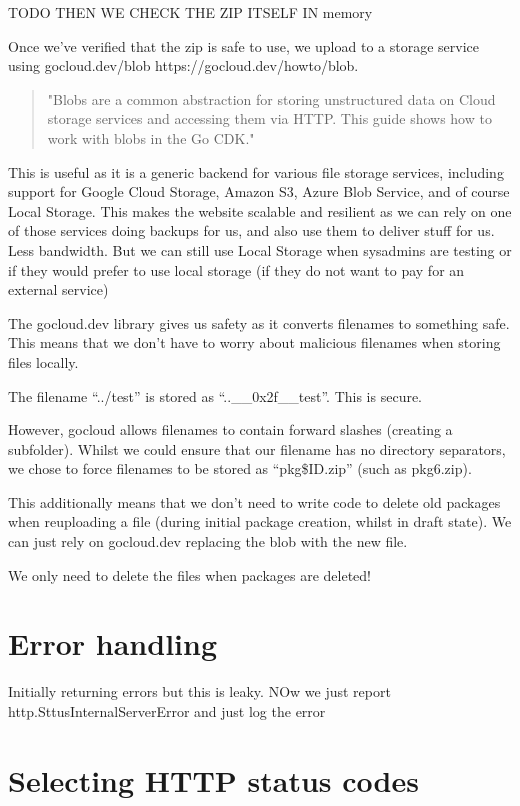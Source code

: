 \documentclass[bsc,frontabs,twoside,singlespacing,parskip,deptreport]{infthesis}     %
\begin{document}
TODO THEN WE CHECK THE ZIP ITSELF IN memory

Once we've verified that the zip is safe to use, we upload to a storage service using gocloud.dev/blob https://gocloud.dev/howto/blob.

\begin{quote}
  "Blobs are a common abstraction for storing unstructured data on Cloud storage services and accessing them via HTTP. This guide shows how to work with blobs in the Go CDK."
\end{quote}

This is useful as it is a generic backend for various file storage services, including support for Google Cloud Storage, Amazon S3, Azure Blob Service, and of course Local Storage. This makes the website scalable and resilient as we can rely on one of those services doing backups for us, and also use them to deliver stuff for us. Less bandwidth. But we can still use Local Storage when sysadmins are testing or if they would prefer to use local storage (if they do not want to pay for an external service)

The gocloud.dev library gives us safety as it converts filenames to something safe. This means that we don't have to worry about malicious filenames when storing files locally.

The filename ``../test'' is stored as ``..\_\_0x2f\_\_test''. This is secure.

However, gocloud allows filenames to contain forward slashes (creating a subfolder). Whilst we could ensure that our filename has no directory separators, we chose to force filenames to be stored as ``pkg\${ID}.zip'' (such as pkg6.zip).

This additionally means that we don't need to write code to delete old packages when reuploading a file (during initial package creation, whilst in draft state). We can just rely on gocloud.dev replacing the blob with the new file.

We only need to delete the files when packages are deleted!

\section{Error handling}

Initially returning errors but this is leaky. NOw we just report http.SttusInternalServerError and just log the error

\section{Selecting HTTP status codes}
\end{document}
